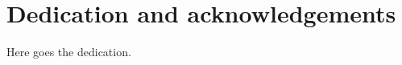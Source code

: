 %
%
\chapter{Dedication and acknowledgements}
\begin{SingleSpace}
Here goes the dedication.
\end{SingleSpace}
\clearpage